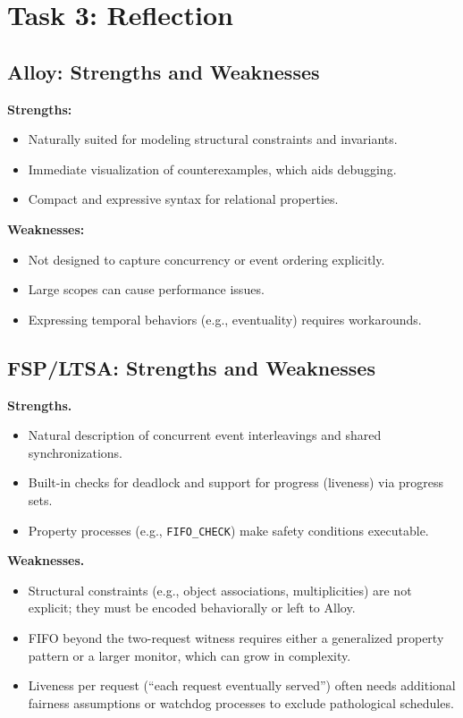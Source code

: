 \documentclass[11pt]{article}
\begin{document}
\section{Task 3: Reflection}
\label{sec:task3}

\subsection{Alloy: Strengths and Weaknesses}

\textbf{Strengths:}
\begin{itemize}[leftmargin=1.5em]
  \item Naturally suited for modeling structural constraints and invariants.
  \item Immediate visualization of counterexamples, which aids debugging.
  \item Compact and expressive syntax for relational properties.
\end{itemize}
\textbf{Weaknesses:}
\begin{itemize}[leftmargin=1.5em]
  \item Not designed to capture concurrency or event ordering explicitly.
  \item Large scopes can cause performance issues.
  \item Expressing temporal behaviors (e.g., eventuality) requires workarounds.
\end{itemize}

\subsection{FSP/LTSA: Strengths and Weaknesses}

\textbf{Strengths.}
\begin{itemize}[leftmargin=1.5em]
  \item Natural description of concurrent event interleavings and shared synchronizations.
  \item Built-in checks for deadlock and support for progress (liveness) via progress sets.
  \item Property processes (e.g., \texttt{FIFO\_CHECK}) make safety conditions executable.
\end{itemize}

\textbf{Weaknesses.}
\begin{itemize}[leftmargin=1.5em]
  \item Structural constraints (e.g., object associations, multiplicities) are not explicit; they must be encoded behaviorally or left to Alloy.
  \item FIFO beyond the two-request witness requires either a generalized property pattern or a larger monitor, which can grow in complexity.
  \item Liveness per request (``each request eventually served'') often needs additional fairness assumptions or watchdog processes to exclude pathological schedules.
\end{itemize}
\end{document}
